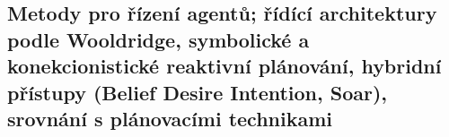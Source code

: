 \subsection{Metody pro řízení agentů; řídící architektury podle Wooldridge, symbolické a konekcionistické reaktivní plánování, hybridní přístupy (Belief Desire Intention, Soar), srovnání s plánovacími technikami}